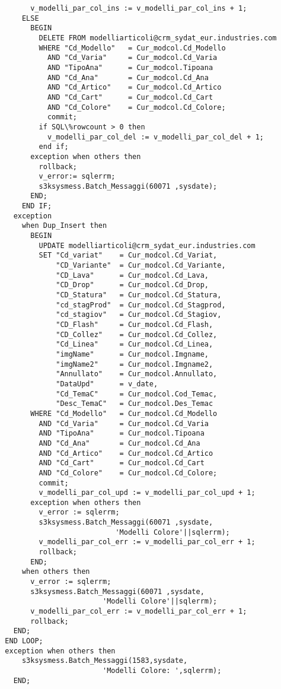 \begin{lstlisting}
        v_modelli_par_col_ins := v_modelli_par_col_ins + 1;
      ELSE
        BEGIN
          DELETE FROM modelliarticoli@crm_sydat_eur.industries.com
          WHERE "Cd_Modello"   = Cur_modcol.Cd_Modello
            AND "Cd_Varia"     = Cur_modcol.Cd_Varia
            AND "TipoAna"      = Cur_modcol.Tipoana
            AND "Cd_Ana"       = Cur_modcol.Cd_Ana
            AND "Cd_Artico"    = Cur_modcol.Cd_Artico
            AND "Cd_Cart"      = Cur_modcol.Cd_Cart
            AND "Cd_Colore"    = Cur_modcol.Cd_Colore;
            commit;
          if SQL\%rowcount > 0 then
            v_modelli_par_col_del := v_modelli_par_col_del + 1;
          end if;
        exception when others then
          rollback;
          v_error:= sqlerrm;
          s3ksysmess.Batch_Messaggi(60071 ,sysdate);
        END;
      END IF;
    exception 
      when Dup_Insert then
        BEGIN
          UPDATE modelliarticoli@crm_sydat_eur.industries.com
          SET "Cd_variat"    = Cur_modcol.Cd_Variat,
              "CD_Variante"  = Cur_modcol.Cd_Variante,
              "CD_Lava"      = Cur_modcol.Cd_Lava,
              "CD_Drop"      = Cur_modcol.Cd_Drop,
              "CD_Statura"   = Cur_modcol.Cd_Statura,
              "cd_stagProd"  = Cur_modcol.Cd_Stagprod,
              "cd_stagiov"   = Cur_modcol.Cd_Stagiov,
              "CD_Flash"     = Cur_modcol.Cd_Flash,
              "CD_Collez"    = Cur_modcol.Cd_Collez,
              "Cd_Linea"     = Cur_modcol.Cd_Linea,
              "imgName"      = Cur_modcol.Imgname,
              "imgName2"     = Cur_modcol.Imgname2,
              "Annullato"    = Cur_modcol.Annullato,
              "DataUpd"      = v_date,
              "Cd_TemaC"     = Cur_modcol.Cod_Temac,
              "Desc_TemaC"   = Cur_modcol.Des_Temac
        WHERE "Cd_Modello"   = Cur_modcol.Cd_Modello
          AND "Cd_Varia"     = Cur_modcol.Cd_Varia
          AND "TipoAna"      = Cur_modcol.Tipoana
          AND "Cd_Ana"       = Cur_modcol.Cd_Ana
          AND "Cd_Artico"    = Cur_modcol.Cd_Artico
          AND "Cd_Cart"      = Cur_modcol.Cd_Cart
          AND "Cd_Colore"    = Cur_modcol.Cd_Colore;
          commit;
          v_modelli_par_col_upd := v_modelli_par_col_upd + 1;
        exception when others then
          v_error := sqlerrm;
          s3ksysmess.Batch_Messaggi(60071 ,sysdate,
	                        'Modelli Colore'||sqlerrm);
          v_modelli_par_col_err := v_modelli_par_col_err + 1;
          rollback;
        END;
      when others then
        v_error := sqlerrm;
        s3ksysmess.Batch_Messaggi(60071 ,sysdate,
                         'Modelli Colore'||sqlerrm);
        v_modelli_par_col_err := v_modelli_par_col_err + 1;
        rollback;
    END;
  END LOOP;
  exception when others then
      s3ksysmess.Batch_Messaggi(1583,sysdate,
                         'Modelli Colore: ',sqlerrm);
    END;
\end{lstlisting}

